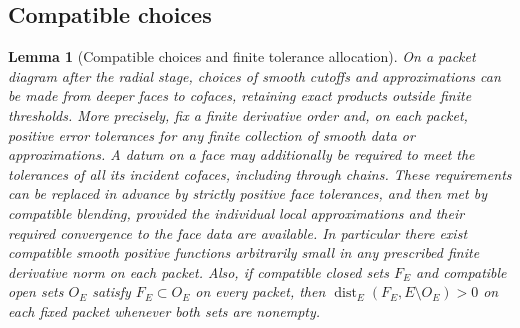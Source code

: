 \documentclass[11pt]{article}
\numberwithin{equation}{section}
\newtheorem{lemma}[theorem]{Lemma}
\theoremstyle{definition}
\theoremstyle{remark}
\begin{document}
\subsection{Compatible choices}

\begin{lemma}[Compatible choices and finite tolerance allocation]\label{packet:approximation}
On a packet diagram after the radial stage, choices of smooth cutoffs and approximations can
be made from deeper faces to cofaces, retaining exact products outside
finite thresholds.  More precisely, fix a finite derivative order and,
on each packet, positive error tolerances for any finite collection of
smooth data or approximations.  A datum on a face may additionally be
required to meet the tolerances of all its incident cofaces, including
through chains.  These requirements can be replaced in advance by
strictly positive face tolerances, and then met by compatible blending,
provided the individual local approximations and their required
convergence to the face data are available.
In particular there exist compatible smooth positive functions
arbitrarily small in any prescribed finite derivative norm on each
packet.  Also, if compatible closed sets $F_E$ and compatible open sets
$O_E$ satisfy $F_E\subset O_E$ on every packet, then
$\operatorname{dist}_E(F_E,E\setminus O_E)>0$ on each fixed packet whenever both
sets are nonempty.
\end{lemma}
\end{document}
